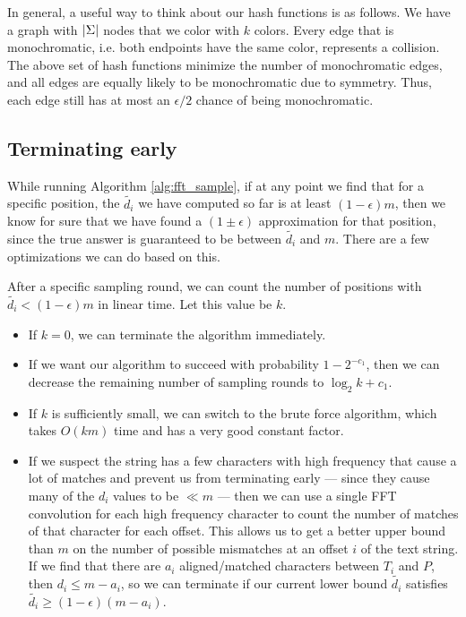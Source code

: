 \documentclass{article}
\theoremstyle{definition}
\newcommand{\eps}{\epsilon}
\DeclarePairedDelimiter{\abs}{\lvert}{\rvert}
\begin{document}
In general, a useful way to think about our hash functions is as follows.
We have a graph with $\abs{\Sigma}$ nodes that we color with $k$ colors.
Every edge that is monochromatic, i.e. both endpoints have the same color, represents a collision.
The above set of hash functions minimize the number of monochromatic edges, and all edges are equally likely to be monochromatic due to symmetry.
Thus, each edge still has at most an $\eps/2$ chance of being monochromatic.

\subsection{Terminating early} \label{sec:term_early}

While running Algorithm \ref{alg:fft_sample}, if at any point we find that for a specific position, the $\tilde{d_i}$ we have computed so far is at least $(1 - \eps)m$, then we know for sure that we have found a $(1 \pm \eps)$ approximation for that position, since the true answer is guaranteed to be between $\tilde{d_i}$ and $m$.
There are a few optimizations we can do based on this.

After a specific sampling round, we can count the number of positions with $\tilde{d_i} < (1 - \eps)m$ in linear time.
Let this value be $k$.
\begin{itemize}
    \item If $k = 0$, we can terminate the algorithm immediately.
    \item If we want our algorithm to succeed with probability $1 - 2^{-c_1}$, then we can decrease the remaining number of sampling rounds to $\log_2 k + c_1$.
    \item If $k$ is sufficiently small, we can switch to the brute force algorithm, which takes $O(km)$ time and has a very good constant factor.
    \item If we suspect the string has a few characters with high frequency that cause a lot of matches and prevent us from terminating early --- since they cause many of the $d_i$ values to be $\ll m$ --- then we can use a single FFT convolution for each high frequency character to count the number of matches of that character for each offset.
    This allows us to get a better upper bound than $m$ on the number of possible mismatches at an offset $i$ of the text string.
    If we find that there are $a_i$ aligned/matched characters between $T_i$ and $P$, then $d_i \le m - a_i$, so we can terminate if our current lower bound $\tilde{d_i}$ satisfies $\tilde{d_i} \ge (1 - \eps)(m - a_i)$.
\end{itemize}
\end{document}
